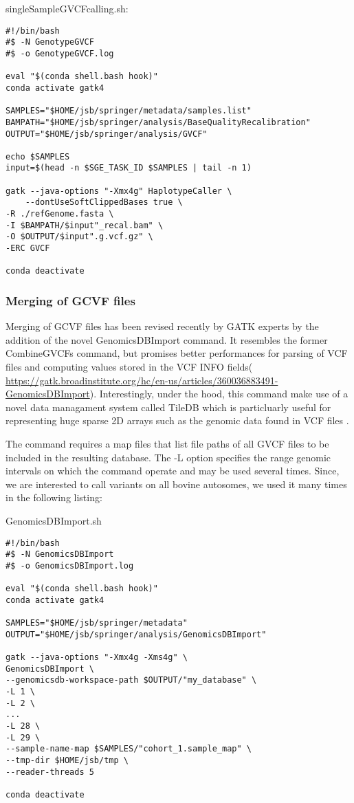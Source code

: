 \noindent singleSampleGVCFcalling.sh:
\begin{verbatim}
#!/bin/bash
#$ -N GenotypeGVCF
#$ -o GenotypeGVCF.log

eval "$(conda shell.bash hook)"
conda activate gatk4

SAMPLES="$HOME/jsb/springer/metadata/samples.list"
BAMPATH="$HOME/jsb/springer/analysis/BaseQualityRecalibration"
OUTPUT="$HOME/jsb/springer/analysis/GVCF"

echo $SAMPLES
input=$(head -n $SGE_TASK_ID $SAMPLES | tail -n 1)

gatk --java-options "-Xmx4g" HaplotypeCaller \
	‐-dontUseSoftClippedBases true \
-R ./refGenome.fasta \
-I $BAMPATH/$input"_recal.bam" \
-O $OUTPUT/$input".g.vcf.gz" \
-ERC GVCF

conda deactivate
\end{verbatim}



\subsubsection{Merging of GCVF files}

Merging of GCVF files has been revised recently by GATK experts by the addition of the novel GenomicsDBImport command. It resembles the former CombineGVCFs command, but promises better performances for parsing of VCF files and computing values stored in the VCF INFO fields( \href{https://gatk.broadinstitute.org/hc/en-us/articles/360036883491-GenomicsDBImport}{https://gatk.broadinstitute.org/hc/en-us/articles/360036883491-GenomicsDBImport}). Interestingly, under the hood, this command make use of a novel data managament system called  TileDB which is particluarly useful for representing huge sparse 2D arrays such as the genomic data found in VCF files \cite{Papadopoulos2016}. 


The command requires a map files that list file paths of all GVCF files to be included in the resulting database. The -L option specifies the range genomic intervals on which the command operate and may be used several times. Since, we are interested to call variants on all bovine autosomes, we used it many times in the following listing:


\noindent GenomicsDBImport.sh
\begin{verbatim}
#!/bin/bash
#$ -N GenomicsDBImport
#$ -o GenomicsDBImport.log	
	
eval "$(conda shell.bash hook)"
conda activate gatk4

SAMPLES="$HOME/jsb/springer/metadata"
OUTPUT="$HOME/jsb/springer/analysis/GenomicsDBImport"

gatk --java-options "-Xmx4g -Xms4g" \
GenomicsDBImport \
--genomicsdb-workspace-path $OUTPUT/"my_database" \
-L 1 \
-L 2 \
...
-L 28 \
-L 29 \
--sample-name-map $SAMPLES/"cohort_1.sample_map" \
--tmp-dir $HOME/jsb/tmp \
--reader-threads 5

conda deactivate

\end{verbatim}


